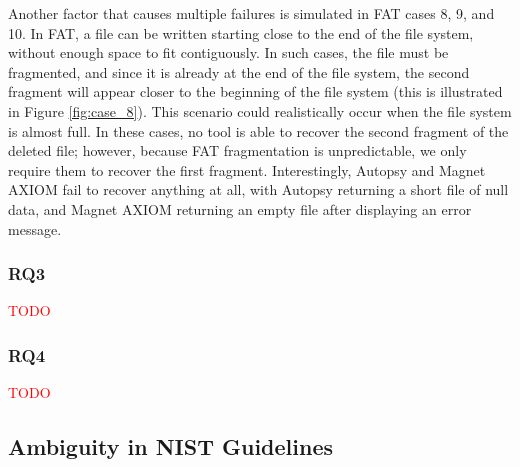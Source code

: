 \documentclass{ws-rv9x6}
\newcommand{\TODO}[1]{\textcolor{red}{#1}} %
\newenvironment{paraphrase}{\color{blue}}{\color{black}} %
\begin{document}
\begin{paraphrase}
Another factor that causes multiple failures is simulated in FAT cases 8, 9, and 10.
In FAT, a file can be written starting close to the end of the file system, without enough space to fit contiguously.
In such cases, the file must be fragmented, and since it is already at the end of the file system, the second fragment will appear closer to the beginning of the file system (this is illustrated in Figure \ref{fig:case_8}).
This scenario could realistically occur when the file system is almost full.
In these cases, no tool is able to recover the second fragment of the deleted file; however, because FAT fragmentation is unpredictable, we only require them to recover the first fragment.
Interestingly, Autopsy and Magnet AXIOM fail to recover anything at all, with Autopsy returning a short file of null data, and Magnet AXIOM returning an empty file after displaying an error message.
\end{paraphrase}

\subsubsection{RQ3}

\TODO{TODO}

\subsubsection{RQ4}

\TODO{TODO}



\subsection{Ambiguity in NIST Guidelines}
\end{document}
